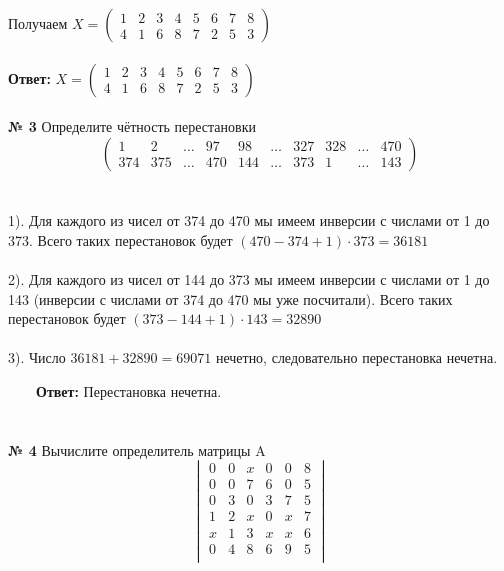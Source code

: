 \documentclass[a4paper, 12pt]{article}
\begin{document}
    \\
    \\ Получаем $X = \begin{pmatrix}1 & 2 & 3 & 4 & 5 & 6 & 7 & 8 \\ 4 & 1 & 6 & 8 & 7 & 2 & 5 & 3 \end{pmatrix}$
    \\
    \\ \textbf{Ответ: } $X = \begin{pmatrix}1 & 2 & 3 & 4 & 5 & 6 & 7 & 8 \\ 4 & 1 & 6 & 8 & 7 & 2 & 5 & 3 \end{pmatrix}$
    \\
    \\ \textbf{№ 3} Определите чётность перестановки
    \\
    \[ 
        \begin{pmatrix}1 & 2 & \dots & 97 & 98 & \dots & 327 & 328 & \dots & 470 \\ 374 & 375 & \dots & 470 & 144 & \dots & 373 & 1 & \dots & 143\end{pmatrix}
    \]
    \\
    \\ 1). Для каждого из чисел от 374 до 470 мы имеем инверсии с числами от 1 до 373. Всего таких перестановок будет $(470 - 374 + 1) \cdot 373 = 36181$
    \\
    \\ 2). Для каждого из чисел от 144 до 373 мы имеем инверсии с числами от 1 до 143 (инверсии с числами от 374 до 470 мы уже посчитали). Всего таких перестановок будет $(373 - 144 + 1) \cdot 143 = 32890$
    \\
    \\ 3). Число $36181 + 32890 = 69071$ нечетно, следовательно перестановка нечетна.
    \\
    \par \ \ \ \ \textbf{Ответ: } Перестановка нечетна.
    \\
    \\
    \\ \textbf{№ 4} Вычислите определитель матрицы A
    \[
        \begin{vmatrix}
            0 & 0 & x & 0 & 0 & 8 \\
            0 & 0 & 7 & 6 & 0 & 5 \\
            0 & 3 & 0 & 3 & 7 & 5 \\
            1 & 2 & x & 0 & x & 7 \\
            x & 1 & 3 & x & x & 6 \\
            0 & 4 & 8 & 6 & 9 & 5 \\
        \end{vmatrix}
    \]
\end{document}
